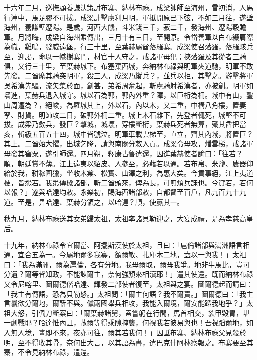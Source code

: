 \begin{pinyinscope}
十六年二月，巡撫顧養謙決策討布寨、納林布祿。成梁帥師至海州，雪初消，人馬行淖中，馬足膠不可拔。成梁計擊虜利月明，軍抵開原已下弦，不如三月往，遂壁海州，養謙壁遼陽。是歲，河西大饑，斗米錢三千，菽二千，發海州、遼陽穀贍軍。月將晦，成梁自海州乘傳出，三月十有三日，至開原。令岱善軍以白布綴肩際為幟，雞鳴，發威遠堡，行三十里，至葉赫屬酋落羅寨。成梁使召落羅，落羅駭兵至，迎謁，命以一幟樹寨門，材官十人守之，戒諸軍毋犯；挾落羅及其從者三騎俱，又行三十里，至葉赫城下。布塞棄西城，奔納林布祿與明軍夾道馳，明軍不敢先發。二酋麾其騎突明軍，殺三人，成梁乃縱兵？，並兵以拒，其擊之。游擊將軍吳希漢先驅，流矢集於面，創甚，弟希周奮起，斬虜騎射希漢者，亦被創。明軍如墻進，葉赫兵退入城守。城以石為郭，郭內外重？障，以巨桁為柵。城中有山，鑿山周遭為？，絕峻，為羅城其上，外以石，內以木，又二重，中構八角樓，置妻孥、財貨。明師攻二日，破郭外柵二重。城上木石雜下，先登者輒死，城堅不可拔。成梁乃斂兵，發巨？擊城，城壞，穿樓斷桁，葉赫兵死者無算，殲其酋把當亥，斬級五百五十四，城中皆號泣。明軍車載雲梯至，直立，齊其內城，將置巨？其上。二酋始大懼，出城乞降，請與南關分敕入貢。成梁令毋攻，燔雲梯，戒諸軍毋發其窖粟，遂引師還。四月朔，釋康古魯遣還，因進葉赫使者諭曰：「往若？順，朝廷賞不薄。江上遠夷以貂皮、人參至，必藉若以通。若布帛、米鹽、農器仰給於我，耕稼圍獵，坐收木枲、松實、山澤之利，為惠大矣。今貢事絕，江上夷道梗，皆怨若。我第傳檄諸部，斬二酋頭來，俾為長，可無煩兵誅也。今貸若，若何以報？」遂與哈達均敕。永樂初，賜海西諸部敕，自都督至百戶，凡九百九十九道。至是，畀哈達、葉赫分領之，以哈達？順，使贏其一。

秋九月，納林布祿送其女弟歸太祖，太祖率諸貝勒迎之，大宴成禮，是為孝慈高皇后。

十九年，納林布祿令宜爾當、阿擺斯漢使於太祖，且曰：「扈倫諸部與滿洲語言相通，宜合五為一。今屬地爾多我寡，額爾敏、扎庫木二地，盍以一與我！」太祖曰：「我為滿洲，爾為扈倫，各有分地。我毋爾取，爾毋我爭。地非牛馬比，豈可分遺？爾等皆知政，不能諫爾主，奈何強顏來相瀆耶！」遣其使還。既而納林布祿又令尼喀里、圖爾德偕哈達、輝發二部使者復至，太祖與之宴。圖爾德起而請曰：「我主有傳語，恐為貝勒怒。」太祖問：「爾主何語？我不爾責。」圖爾德曰：「我主言曩欲分爾地，爾靳不與。儻兩國舉兵相攻，我能入爾境，爾安能蹈我地乎？」太祖大怒，引佩刀斷案曰：「爾葉赫諸舅，盍嘗躬在行間，馬首相交，裂甲毀胄，堪一劇戰耶？哈達惟內訌，故爾等得乘隙掩襲，何視我若彼易與也！吾視蹈爾地，如入無人境，晝即不來，夜亦可往，爾其若我何！」因詆布寨、納林布祿父見殺於明，至不得收其骨，奈何出大言，以其語為書，遣巴克什阿林察報之。布寨要至其寨，不令見納林布祿，遣還。


\end{pinyinscope}

